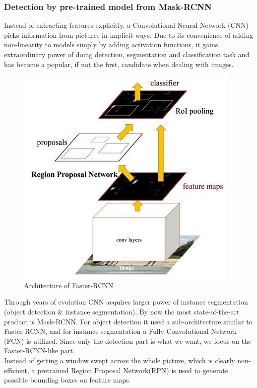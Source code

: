 \documentclass{article}
\begin{document}
\subsubsection{Detection by pre-trained model from Mask-RCNN}
Instead of extracting features explicitly, a Convolutional Neural Network (CNN) picks information from pictures in implicit ways. Due to its convenience of adding non-linearity to models simply by adding activation functions, it gains extraordinary power of doing detection, segmentation and classification task and has become a popular, if not the first, candidate when dealing with images.\\
\begin{figure}
  \centering
  \includegraphics[scale=0.5]{report/pic/2/RCNN_arch.jpg} 
  \caption{Architecture of Faster-RCNN}
\end{figure}
Through years of evolution CNN acquires larger power of instance segmentation (object detection \& instance segmentation). By now the most state-of-the-art product is Mask-RCNN. For object detection it used a sub-architecture similar to Faster-RCNN, and for instance segmentation a Fully Convolutional Network (FCN) is utilized. Since only the detection part is what we want, we focus on the Faster-RCNN-like part.\\
Instead of getting a window swept across the whole picture, which is clearly non-efficient, a pretrained Region Proposal Network(RPN) is used to generate possible bounding boxes on feature maps.\\
\end{document}
